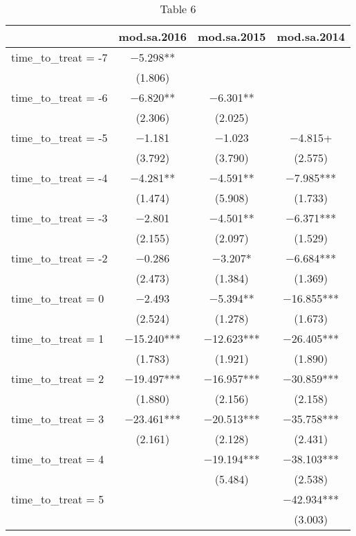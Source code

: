 \begin{table}

\caption{Table 6}
\centering
\begin{tabular}[t]{lccc}
\toprule
  & mod.sa.2016 & mod.sa.2015 & mod.sa.2014\\
\midrule
time\_to\_treat = -7 & \num{-5.298}** &  & \\
 & (\num{1.806}) &  & \\
time\_to\_treat = -6 & \num{-6.820}** & \num{-6.301}** & \\
 & (\num{2.306}) & (\num{2.025}) & \\
time\_to\_treat = -5 & \num{-1.181} & \num{-1.023} & \num{-4.815}+\\
 & (\num{3.792}) & (\num{3.790}) & (\num{2.575})\\
time\_to\_treat = -4 & \num{-4.281}** & \num{-4.591}** & \num{-7.985}***\\
 & (\num{1.474}) & (\num{5.908}) & (\num{1.733})\\
time\_to\_treat = -3 & \num{-2.801} & \num{-4.501}** & \num{-6.371}***\\
 & (\num{2.155}) & (\num{2.097}) & (\num{1.529})\\
time\_to\_treat = -2 & \num{-0.286} & \num{-3.207}* & \num{-6.684}***\\
 & (\num{2.473}) & (\num{1.384}) & (\num{1.369})\\
time\_to\_treat = 0 & \num{-2.493} & \num{-5.394}** & \num{-16.855}***\\
 & (\num{2.524}) & (\num{1.278}) & (\num{1.673})\\
time\_to\_treat = 1 & \num{-15.240}*** & \num{-12.623}*** & \num{-26.405}***\\
 & (\num{1.783}) & (\num{1.921}) & (\num{1.890})\\
time\_to\_treat = 2 & \num{-19.497}*** & \num{-16.957}*** & \num{-30.859}***\\
 & (\num{1.880}) & (\num{2.156}) & (\num{2.158})\\
time\_to\_treat = 3 & \num{-23.461}*** & \num{-20.513}*** & \num{-35.758}***\\
 & (\num{2.161}) & (\num{2.128}) & (\num{2.431})\\
time\_to\_treat = 4 &  & \num{-19.194}*** & \num{-38.103}***\\
 &  & (\num{5.484}) & (\num{2.538})\\
time\_to\_treat = 5 &  &  & \num{-42.934}***\\
 &  &  & (\num{3.003})\\

\end{tabular}
\end{table}
